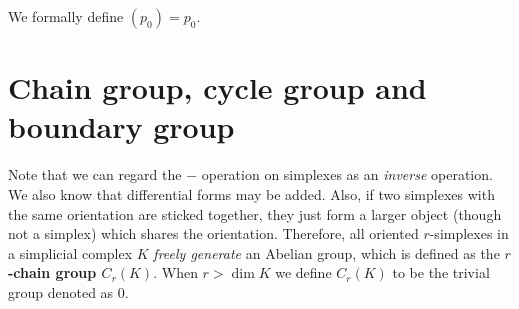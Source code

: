 \documentclass[hyperref, a4paper]{article}
\newcommand*{\concept}[1]{{\textbf{#1}}}
\begin{document}
We formally define $(p_0) = p_0$.

\section{Chain group, cycle group and boundary group}

Note that we can regard the $-$ operation on simplexes as an \emph{inverse} operation.
We also know that differential forms may be added.
Also, if two simplexes with the same orientation are sticked together, they just form a larger object (though not a simplex)
which shares the orientation.
Therefore, all oriented $r$-simplexes in a simplicial complex $K$ \emph{freely generate} an Abelian group,
which is defined as the \concept{$r$-chain group $C_r(K)$}.
When $r > \dim K$ we define $C_r(K)$ to be the trivial group denoted as 0.


 
\end{document}
